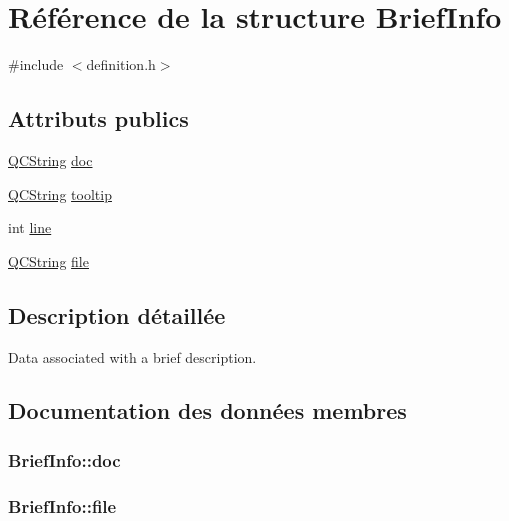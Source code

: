\hypertarget{struct_brief_info}{}\section{Référence de la structure Brief\+Info}
\label{struct_brief_info}


{\ttfamily \#include $<$definition.\+h$>$}

\subsection*{Attributs publics}
\begin{DoxyCompactItemize}
\item 
\hyperlink{class_q_c_string}{Q\+C\+String} \hyperlink{struct_brief_info_aecb19c35c099c07820b74f23fc298a82}{doc}
\item 
\hyperlink{class_q_c_string}{Q\+C\+String} \hyperlink{struct_brief_info_a5b7799657df3d9b893527be844a55562}{tooltip}
\item 
int \hyperlink{struct_brief_info_adae4029a5e60d63720902578c56fd95b}{line}
\item 
\hyperlink{class_q_c_string}{Q\+C\+String} \hyperlink{struct_brief_info_ac97b972247e0c7ac3ccf1e1bd29cf77e}{file}
\end{DoxyCompactItemize}


\subsection{Description détaillée}
Data associated with a brief description. 

\subsection{Documentation des données membres}
\hypertarget{struct_brief_info_aecb19c35c099c07820b74f23fc298a82}{}
\subsubsection[{doc}]{ Brief\+Info\+::doc}\label{struct_brief_info_aecb19c35c099c07820b74f23fc298a82}
\hypertarget{struct_brief_info_ac97b972247e0c7ac3ccf1e1bd29cf77e}{}
\subsubsection[{file}]{ Brief\+Info\+::file}\label{struct_brief_info_ac97b972247e0c7ac3ccf1e1bd29cf77e}
\hypertarget{struct_brief_info_adae4029a5e60d63720902578c56fd95b}{}
